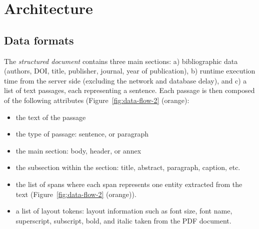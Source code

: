 \section{Architecture}
\subsection{Data formats}
\label{subsec:data-formats}

The \textit{structured document} contains three main sections: a) bibliographic data (authors, DOI, title, publisher, journal, year of publication), b) runtime execution time from the server side (excluding the network and database delay), and c) a list of text passages, each representing a sentence.
Each passage is then composed of the following attributes (Figure~\ref{fig:data-flow-2} (orange): 
\begin{itemize}
\item the text of the passage
\item the type of passage: sentence, or paragraph
\item the main section: body, header, or annex
\item the subsection within the section: title, abstract, paragraph, caption, etc.
\item the list of spans where each span represents one entity extracted from the text (Figure~\ref{fig:data-flow-2} (orange)).
\item a list of layout tokens: layout information such as font size, font name, superscript, subscript, bold, and italic taken from the PDF document.
\end{itemize}

